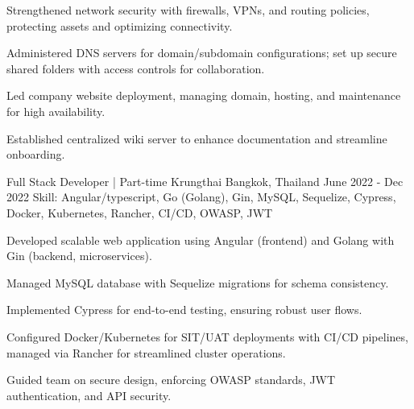 \begin{cventries}
{\begin{cvitems}
      \item {Strengthened network security with firewalls, VPNs, and routing policies, protecting assets and optimizing connectivity.}
      \item {Administered DNS servers for domain/subdomain configurations; set up secure shared folders with access controls for collaboration.}
      \item {Led company website deployment, managing domain, hosting, and maintenance for high availability.}
      \item {Established centralized wiki server to enhance documentation and streamline onboarding.}
      \end{cvitems}
    }

\cventry
  {Full Stack Developer | Part-time} %
  {Krungthai} %
  {Bangkok, Thailand} %
  {June 2022 - Dec 2022} %
  {Skill: Angular/typescript, Go (Golang), Gin, MySQL, Sequelize, Cypress, Docker, Kubernetes, Rancher, CI/CD, OWASP, JWT} %
  {
    \begin{cvitems} %
      \item {Developed scalable web application using Angular (frontend) and Golang with Gin (backend, microservices).}
      \item {Managed MySQL database with Sequelize migrations for schema consistency.}
      \item {Implemented Cypress for end-to-end testing, ensuring robust user flows.}
      \item {Configured Docker/Kubernetes for SIT/UAT deployments with CI/CD pipelines, managed via Rancher for streamlined cluster operations.}
      \item {Guided team on secure design, enforcing OWASP standards, JWT authentication, and API security.}
    \end{cvitems}
  }


\end{cventries}
